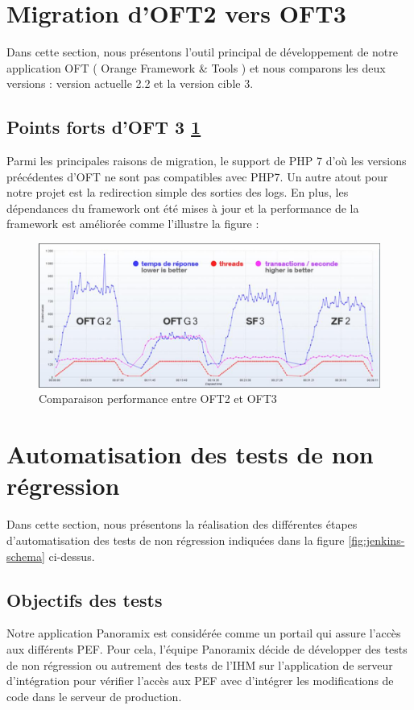 \section{Migration d’OFT2 vers OFT3}
Dans cette section, nous présentons l’outil principal de développement de notre application OFT ( Orange Framework \& Tools ) et nous comparons les deux versions : version actuelle 2.2 et la version cible 3.
\subsection{Points forts d’OFT 3 \ref{fig:oft-3}}
Parmi les principales raisons de migration, le support de PHP 7 d’où les versions précédentes  d’OFT ne sont pas compatibles avec PHP7. Un autre atout pour notre projet est la redirection simple des sorties des logs. En plus, les dépendances du framework ont été mises à jour et la performance de la framework est améliorée comme l'illustre la figure  :
\begin{figure}[H]
	\centering
	\includegraphics[width=0.7\linewidth]{img/oft-3}
	\caption[Comparaison performance entre OFT2 et OFT3]{Comparaison performance entre OFT2 et OFT3\cite{oft-doc}}
	\label{fig:oft-3}
\end{figure}
\section[Automatisation des tests de non régression]{Automatisation des tests de non régression}
Dans cette section, nous présentons la réalisation des différentes étapes d’automatisation des tests de non régression indiquées dans la figure \ref{fig:jenkins-schema} ci-dessus.
\subsection{Objectifs des tests}
Notre application Panoramix est considérée comme un portail qui assure l’accès aux différents PEF. Pour cela, l’équipe Panoramix décide de développer des  tests de non régression ou autrement des tests de l’IHM sur l’application de serveur d'intégration pour vérifier l’accès aux PEF avec d’intégrer les modifications de code dans le serveur de production.
